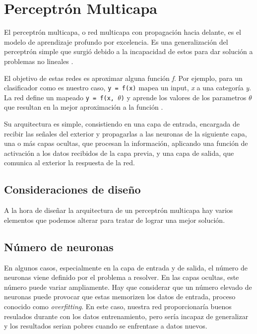 \section{Perceptrón Multicapa}\label{sec:perceptron-multicapa}

El perceptrón multicapa, o red multicapa con propagación hacia delante,
es el modelo de aprendizaje profundo por excelencia. Es una
generalización del perceptrón simple que surgió debido a la incapacidad
de estos para dar solución a problemas no lineales \cite{Minsky-1969}.

El objetivo de estas redes es aproximar alguna función \emph{f}. Por
ejemplo, para un clasificador como es nuestro caso,
\texttt{y = f(x)} mapea un input, \emph{x} a una categoría \emph{y}.
La red define un mapeado \texttt{y = f(x, $\theta$)} y aprende los valores de los parametros $\theta$ que resultan en la mejor aproximación a la función \cite{Goodfellow-et-al-2016}.

Su arquitectura es simple, consistiendo en una capa de entrada,
encargada de recibir las señales del exterior y propagarlas a las
neuronas de la siguiente capa, una o más capas ocultas, que procesan la
información, aplicando una función de activación a los datos recibidos
de la capa previa, y una capa de salida, que comunica al exterior la
respuesta de la red.


\subsection{Consideraciones de diseño}\label{consideraciones-de-diseno}

A la hora de diseñar la arquitectura de un perceptrón multicapa hay
varios elementos que podemos alterar para tratar de lograr una mejor
solución.

\subsection{Número de neuronas}\label{numero-de-neuronas}

En algunos casos, especialmente en la capa de entrada y de salida, el
número de neuronas viene definido por el problema a resolver. En las
capas ocultas, este número puede variar ampliamente. Hay que considerar
que un número elevado de neuronas puede provocar que estas memorizen los
datos de entrada, proceso conocido como \emph{overfitting}. En este
caso, nuestra red proporcionaría buenos resulados durante con los datos
entrenamiento, pero sería incapaz de generalizar y los resultados serian
pobres cuando se enfrentase a datos nuevos.

